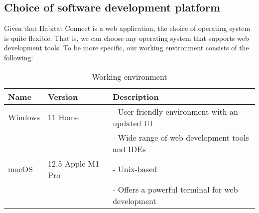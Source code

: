 \documentclass[conference]{IEEEtran}
\begin{document}
\subsection{Choice of software development platform}
Given that Habitat Connect is a web application, the choice of operating system is quite flexible. That is, we can choose any operating system that supports web development tools. To be more specific, our working environment consists of the following:
\begin{table}[htbp]
\centering
\begin{tabular}{|p{1.6cm}|l|p{3.6cm}|}
\hline
\textbf{Name} & \textbf{Version} & \textbf{Description}\\
\hline
Windows & 11 Home & 
- User-friendly environment with an updated UI \\
& & 
- Wide range of web development tools and IDEs \\
\hline
macOS & 12.5 Apple M1 Pro & 
- Unix-based \\
& & 
- Offers a powerful terminal for web development \\
\hline
\end{tabular}
\caption{Working environment}
\label{tab2}
\end{table}
\end{document}
